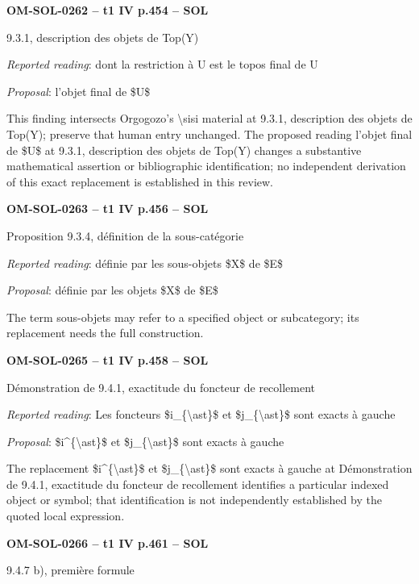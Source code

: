 \par\noindent\textbf{OM-SOL-0262 -- t1 IV p.454 -- SOL}\par
9.3.1, description des objets de Top(Y)\par
\emph{Reported reading}: dont la restriction à U est le topos final de U\par
\emph{Proposal}: l'objet final de \$U\$\par
This finding intersects Orgogozo's \textbackslash{}sisi material at 9.3.1, description des objets de Top(Y); preserve that human entry unchanged. The proposed reading l'objet final de \$U\$ at 9.3.1, description des objets de Top(Y) changes a substantive mathematical assertion or bibliographic identification; no independent derivation of this exact replacement is established in this review.\par
\par\noindent\textbf{OM-SOL-0263 -- t1 IV p.456 -- SOL}\par
Proposition 9.3.4, définition de la sous-catégorie\par
\emph{Reported reading}: définie par les sous-objets \$X\$ de \$E\$\par
\emph{Proposal}: définie par les objets \$X\$ de \$E\$\par
The term sous-objets may refer to a specified object or subcategory; its replacement needs the full construction.\par
\par\noindent\textbf{OM-SOL-0265 -- t1 IV p.458 -- SOL}\par
Démonstration de 9.4.1, exactitude du foncteur de recollement\par
\emph{Reported reading}: Les foncteurs \$i\_\{\textbackslash{}ast\}\$ et \$j\_\{\textbackslash{}ast\}\$ sont exacts à gauche\par
\emph{Proposal}: \$i\textasciicircum{}\{\textbackslash{}ast\}\$ et \$j\_\{\textbackslash{}ast\}\$ sont exacts à gauche\par
The replacement \$i\textasciicircum{}\{\textbackslash{}ast\}\$ et \$j\_\{\textbackslash{}ast\}\$ sont exacts à gauche at Démonstration de 9.4.1, exactitude du foncteur de recollement identifies a particular indexed object or symbol; that identification is not independently established by the quoted local expression.\par
\par\noindent\textbf{OM-SOL-0266 -- t1 IV p.461 -- SOL}\par
9.4.7 b), première formule\par
